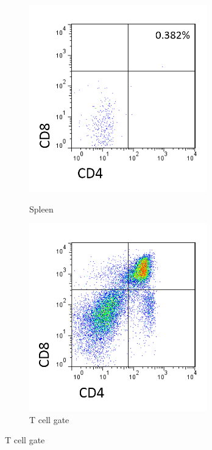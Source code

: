 \begin{figure}
\begin{subfigure}{0.25\textwidth}
	\centering
	\caption{Spleen}
	\includegraphics[width=0.85\textwidth]{Figures/SplnallposGFPpos.png}	
	\label{subfig:spleenRAGCD19DP}
	\end{subfigure}
	\hfill
	\begin{subfigure}{0.25\textwidth}
	\centering
	\caption{T cell gate}
	\includegraphics[width=0.85\textwidth]{Figures/Tcellgate.png}	

\end{subfigure}
\end{figure}
